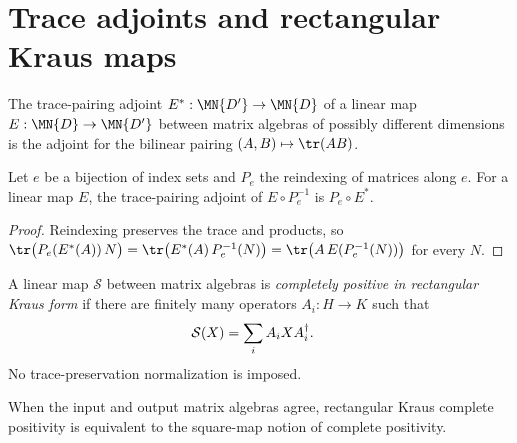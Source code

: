 \section{Trace adjoints and rectangular Kraus maps}

\begin{definition}\label{def:trace_pairing_adjoint}
    \leanok
    The trace-pairing adjoint $E^* : \MN{D'} \to \MN{D}$ of a linear map
    $E : \MN{D} \to \MN{D'}$ between matrix algebras of possibly different
    dimensions is the adjoint for the bilinear pairing
    $(A,B)\mapsto \tr(AB)$.
\end{definition}

\begin{lemma}
    \label{lem:trace_adjoint_reindex}
    \leanok
    Let $e$ be a bijection of index sets and $P_e$ the reindexing of matrices along $e$.
    For a linear map $E$, the trace-pairing adjoint of $E\circ P_e^{-1}$ is
    $P_e\circ E^*$.
\end{lemma}
\begin{proof}\leanok
    Reindexing preserves the trace and products, so
    $\tr\bigl(P_e(E^*(A))\,N\bigr)=\tr\bigl(E^*(A)\,P_e^{-1}(N)\bigr)
    =\tr\bigl(A\,E(P_e^{-1}(N))\bigr)$ for every $N$.
\end{proof}

\begin{definition}
    \label{def:is_kraus_cp}
    \leanok
    A linear map $\mathcal S$ between matrix algebras is \emph{completely
    positive in rectangular Kraus form} if there are finitely many operators
    $A_i:H\to K$ such that
    \begin{align}
        \mathcal S(X)&=\sum_i A_iXA_i^\dagger.
        \notag
    \end{align}
    No trace-preservation normalization is imposed.
\end{definition}

\begin{lemma}
    \label{lem:is_kraus_cp_iff_is_cp_map}
    \leanok
    When the input and output matrix algebras agree, rectangular Kraus complete
    positivity is equivalent to the square-map notion of complete positivity.
\end{lemma}

